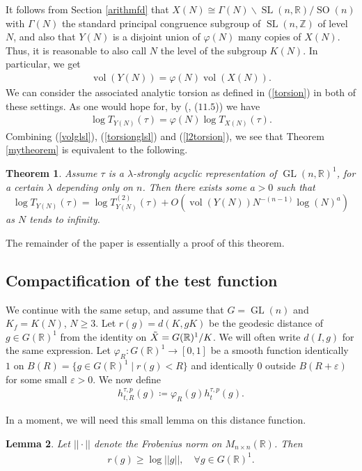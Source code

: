 \documentclass[11pt,reqno]{amsart}
\numberwithin{equation}{section}
\newtheorem{thm}{Theorem}[section]
\newtheorem{lem}[thm]{Lemma}
\theoremstyle{definition}
\theoremstyle{remark}
\newcommand{\GL}{\operatorname{GL}}
\newcommand{\SL}{\operatorname{SL}}
\newcommand{\SO}{\operatorname{SO}}
\newcommand{\vol}{\operatorname{vol}}
\newcommand{\Z}{\mathbb{Z}}
\newcommand{\R}{\mathbb{R}}
\renewcommand{\phi}{\varphi}
\renewcommand{\epsilon}{\varepsilon}
\begin{document}
It follows from Section \ref{arithmfd} that $X(N)\cong \Gamma(N)\backslash \SL(n,\R)/\SO(n)$ with $\Gamma(N)$ the standard principal congruence subgroup of $\SL(n,\Z)$ of level $N$, and also that $Y(N)$ is a disjoint union of $\phi(N)$ many copies of $X(N)$. Thus, it is reasonable to also call $N$ the level of the subgroup $K(N)$. In particular, we get
\begin{align}\label{volglsl}
    \vol(Y(N)) = \phi(N)\vol(X(N)).
\end{align}
We can consider the associated analytic torsion as defined in (\ref{torsion}) in both of these settings. As one would hope for, by (\cite{MzM2}, ($11.5$)) we have
\begin{align}\label{torsionglsl}
    \log T_{Y(N)}(\tau) = \phi(N)\log T_{X(N)}(\tau).
\end{align}
Combining (\ref{volglsl}), (\ref{torsionglsl}) and (\ref{l2torsion}), we see that Theorem \ref{mytheorem} is equivalent to the following.
\begin{thm}\label{glmytheorem}
    Assume $\tau$ is a $\lambda$-strongly acyclic representation of $\GL(n,\R)^1$, for a certain $\lambda$ depending only on $n$. Then there exists some $a>0$ such that
    $$\log T_{Y(N)}(\tau) = \log T_{Y(N)}^{(2)}(\tau)+O(\vol(Y(N))N^{-(n-1)}\log(N)^a)$$
    as $N$ tends to infinity.
\end{thm}
\noindent The remainder of the paper is essentially a proof of this theorem. 


\subsection*{Compactification of the test function}\label{compactsub}

\noindent We continue with the same setup, and assume that $G=\GL(n)$ and $K_f=K(N)$, $N\geq 3$. Let $r(g)=d(K,gK)$ be the geodesic distance of $g\in G(\R)^1$ from the identity on $\Tilde{X}=G(\R)^1/K$. We will often write $d(I,g)$ for the same expression. Let $\phi_R:G(\R)^1\to [0,1]$ be a smooth function identically $1$ on $B(R)=\lbrace g\in G(\R)^1\mid r(g)< R\rbrace$ and identically $0$ outside $B(R+\epsilon)$ for some small $\epsilon>0$. We now define
\begin{align*}
    h_{t,R}^{\tau,p}(g)\coloneqq \phi_R(g)h_t^{\tau,p}(g).
\end{align*}

\noindent In a moment, we will need this small lemma on this distance function.

\begin{lem}\label{distancebound}
    Let $||\cdot||$ denote the Frobenius norm on $M_{n\times n}(\R)$. Then
    \begin{align*}
        r(g) \geq \log ||g||, \quad \forall g\in G(\R)^1.
    \end{align*}
\end{lem}
\end{document}
